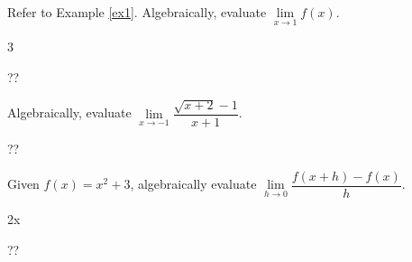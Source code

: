 \begin{comment}
\begin{itemize}
  
   \item Examples 3 from \cite{Hoffman} ; page 79
    \item Examples 2.17-2.20 from \cite{openstax}; pages 165-167.
    \item Example 2.5 (OpenStax; pg.138): Evaluate \(\lim\limits_{x \to 4} \displaystyle \frac{\sqrt{x}-2}{x-4}\) using a table of functional values\\\\
    \item Practice 2.4 (OpenStax; pg.139): Estimate \(\lim\limits_{x \to 1} \displaystyle \frac{\frac{1}{x}-1}{x-1}\)\\
\end{itemize}
\end{comment}
\begin{example}
Refer to Example \ref{ex1}. Algebraically, evaluate  \(\lim\limits_{x \to 1} f(x)\).

    \begin{sol}
      3
    \end{sol}
    \begin{solL}
    ??
    
    \end{solL}
    
\end{example}
\begin{example}
Algebraically, evaluate  \(\lim\limits_{x \to -1} \dfrac{\sqrt{x+2}-1}{x+1}\).

    \begin{sol}
    \end{sol}
    \begin{solL}
    ??
    
    \end{solL}
    
\end{example}

\begin{example}
Given \(f(x)=x^2+3\), algebraically evaluate \(\lim\limits_{h \to 0} \dfrac{f(x+h)-f(x)}{h}\).
    \begin{sol}
    2x
    \end{sol}
    \begin{solL}
    ??
    \end{solL}
    
\end{example}

